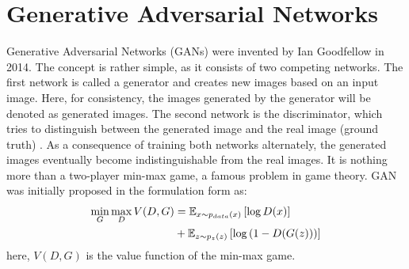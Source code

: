 \section{Generative Adversarial Networks}
Generative Adversarial Networks (GANs) were invented by Ian Goodfellow in 2014. The concept is rather simple, as it consists of two competing networks. The first network is called a generator and creates new images based on an input image. Here, for consistency, the images generated by the generator will be denoted as generated images. The second network is the discriminator, which tries to distinguish between the generated image and the real image (ground truth) \cite{goodfellow2014generative}.
As a consequence of training both networks alternately, the generated images eventually become indistinguishable from the real images. It is nothing more than a two-player min-max game, a famous problem in game theory. GAN was initially proposed in the formulation form as:
\begin{equation}
	\centering
	\begin{aligned}
		\min_{G} \max_{D} V(D, G) &= \mathbb{E}_{x \sim p_{data}(x)} \left[ \log D(x) \right] \\
		&+ \mathbb{E}_{z \sim p_{z}(z)} \left[ \log \left( 1-D(G(z)) \right) \right]
	\end{aligned}
	\label{eq:Basic_GAN}
\end{equation}
here, $V(D, G)$ is the value function of the min-max game. 

